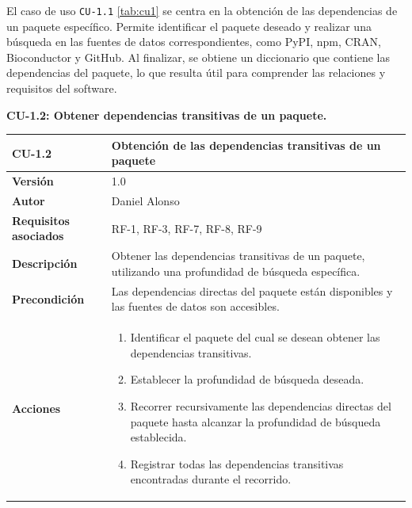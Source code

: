 El caso de uso \texttt{CU-1.1} \ref{tab:cu1} se centra en la obtención de las dependencias de un paquete específico. Permite
identificar el paquete deseado y realizar una búsqueda en las fuentes de datos correspondientes, como PyPI,
npm, CRAN, Bioconductor y GitHub. Al finalizar, se obtiene un diccionario que contiene las dependencias del
paquete, lo que resulta útil para comprender las relaciones y requisitos del software.



\textbf{CU-1.2: Obtener dependencias transitivas de un paquete.}

\begin{table}[p]
	\centering
	\begin{tabularx}{\linewidth}{ p{} p{} }
		\toprule
		\textbf{CU-1.2}               & \textbf{Obtención de las dependencias transitivas de un paquete}                                       \\
		\toprule
		\textbf{Versión}              & 1.0                                                                                                    \\
		\textbf{Autor}                & Daniel Alonso                                                                                          \\
		\textbf{Requisitos asociados} & RF-1, RF-3, RF-7, RF-8, RF-9                                                                           \\
		\textbf{Descripción}          & Obtener las dependencias transitivas de un paquete, utilizando una profundidad de búsqueda específica. \\
		\textbf{Precondición}         & Las dependencias directas del paquete están disponibles y las fuentes de datos son accesibles.         \\
		\textbf{Acciones}             &
		\begin{enumerate}
			\def\labelenumi{\arabic{enumi}.}
			\tightlist
			\item Identificar el paquete del cual se desean obtener las dependencias transitivas.
			\item Establecer la profundidad de búsqueda deseada.
			\item Recorrer recursivamente las dependencias directas del paquete hasta alcanzar la profundidad de búsqueda establecida.
			\item Registrar todas las dependencias transitivas encontradas durante el recorrido.
		\end{enumerate}              \\

\end{tabularx}
\end{table}

